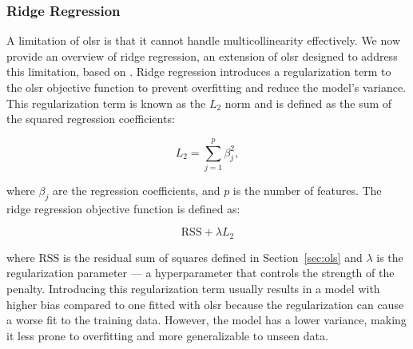 \subsubsection{Ridge Regression}
A limitation of \gls{olsr} is that it cannot handle multicollinearity effectively.
We now provide an overview of ridge regression, an extension of \gls{olsr} designed to address this limitation, based on \citet{James2023AnIS}.
Ridge regression introduces a regularization term to the \gls{olsr} objective function to prevent overfitting and reduce the model's variance.
This regularization term is known as the $L_2$ norm and is defined as the sum of the squared regression coefficients:

$$
L_2 = \sum_{j=1}^{p} \beta_j^2,
$$

where $\beta_j$ are the regression coefficients, and $p$ is the number of features.
The ridge regression objective function is defined as:

$$
\text{RSS} + \lambda L_2
$$

where $\text{RSS}$ is the residual sum of squares defined in Section~\ref{sec:ols} and $\lambda$ is the regularization parameter --- a hyperparameter that controls the strength of the penalty.
Introducing this regularization term usually results in a model with higher bias compared to one fitted with \gls{olsr} because the regularization can cause a worse fit to the training data.
However, the model has a lower variance, making it less prone to overfitting and more generalizable to unseen data.